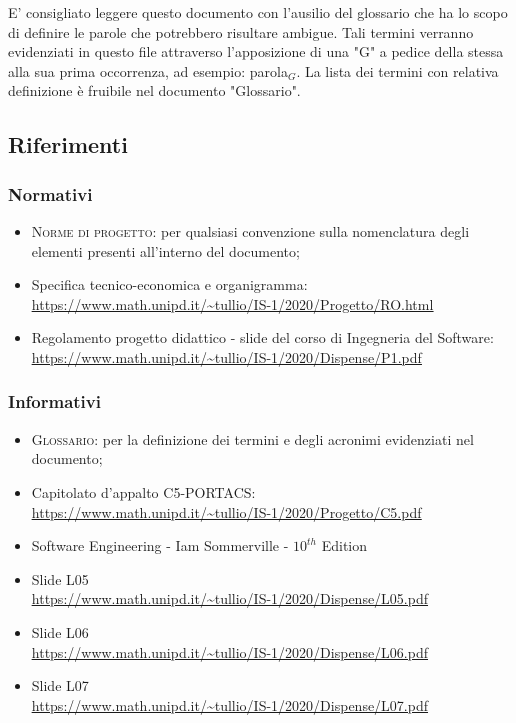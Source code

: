 E' consigliato leggere questo documento con l'ausilio del glossario che ha lo scopo di definire le parole che potrebbero risultare ambigue. Tali termini verranno evidenziati in questo file attraverso l'apposizione di una "G" a pedice della stessa alla sua prima occorrenza, ad esempio: parola$_G$.
La lista dei termini con relativa definizione è fruibile nel documento "Glossario".




\subsection{Riferimenti}



\subsubsection{Normativi}

\begin{itemize}
	\item \textsc{Norme di progetto}: per qualsiasi convenzione sulla nomenclatura degli elementi presenti all’interno del documento;
	\item Specifica tecnico-economica e organigramma: \\  \uline{\url{https://www.math.unipd.it/~tullio/IS-1/2020/Progetto/RO.html}} %
	\item Regolamento progetto didattico - slide del corso di Ingegneria del Software: \\ \uline{\url{https://www.math.unipd.it/~tullio/IS-1/2020/Dispense/P1.pdf}}
\end{itemize}



\subsubsection{Informativi}
\begin{itemize}
	\item \textsc{Glossario}: per la definizione dei termini e degli acronimi evidenziati nel documento;
	\item Capitolato d'appalto C5-PORTACS: \\
	\uline{\url{https://www.math.unipd.it/~tullio/IS-1/2020/Progetto/C5.pdf}}
	\item Software Engineering - Iam Sommerville - $10^{th}$ Edition
	\item Slide L05 \\
	\uline{\url{https://www.math.unipd.it/~tullio/IS-1/2020/Dispense/L05.pdf}}%
	\item Slide L06 \\
	\uline{\url{https://www.math.unipd.it/~tullio/IS-1/2020/Dispense/L06.pdf}}%
	\item Slide L07 \\
	\uline{\url{https://www.math.unipd.it/~tullio/IS-1/2020/Dispense/L07.pdf}}%
\end{itemize}